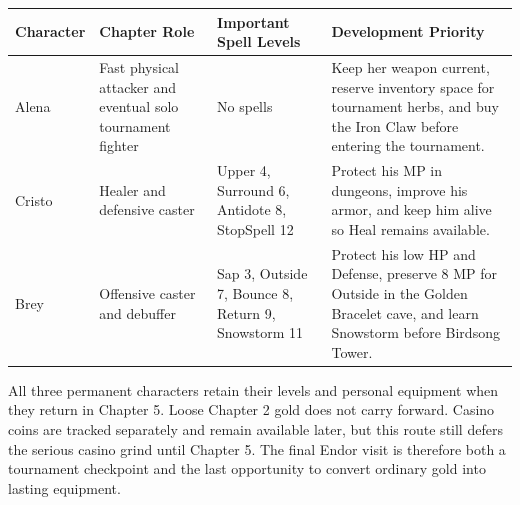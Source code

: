 \documentclass[
  american,
  10pt,
  letterpaper,
  oneside,
  open=any]{scrreprt}
\newcounter{none} %
\newenvironment{guidetable}{%
  \small\setstretch{1.0}%
  \setlength{\tabcolsep}{4pt}%
  \setlength{\LTpre}{8pt}\setlength{\LTpost}{10pt}%
  \renewcommand{\arraystretch}{1.16}%
}{ }
\begin{document}
\begin{guidetable}

{\def\LTcaptype{none} %
\begin{longtable}[]{@{}
  >{\raggedright\arraybackslash}p{}
  >{\raggedright\arraybackslash}p{}
  >{\raggedright\arraybackslash}p{}
  >{\raggedright\arraybackslash}p{}@{}}
\toprule\noalign{}
\begin{minipage}[b]{\linewidth}\raggedright
\color{GuideGreen}\bfseries Character
\end{minipage} & \begin{minipage}[b]{\linewidth}\raggedright
\color{GuideGreen}\bfseries Chapter Role
\end{minipage} & \begin{minipage}[b]{\linewidth}\raggedright
\color{GuideGreen}\bfseries Important Spell Levels
\end{minipage} & \begin{minipage}[b]{\linewidth}\raggedright
\color{GuideGreen}\bfseries Development Priority
\end{minipage} \\
\midrule\noalign{}
\endhead
\bottomrule\noalign{}
\endlastfoot
Alena & Fast physical attacker and eventual solo tournament fighter & No
spells & Keep her weapon current, reserve inventory space for tournament
herbs, and buy the Iron Claw before entering the tournament. \\
Cristo & Healer and defensive caster & Upper 4, Surround 6, Antidote 8,
StopSpell 12 & Protect his MP in dungeons, improve his armor, and keep
him alive so Heal remains available. \\
Brey & Offensive caster and debuffer & Sap 3, Outside 7, Bounce 8,
Return 9, Snowstorm 11 & Protect his low HP and Defense, preserve 8 MP
for Outside in the Golden Bracelet cave, and learn Snowstorm before
Birdsong Tower. \\
\end{longtable}
}

\end{guidetable}

All three permanent characters retain their levels and personal
equipment when they return in Chapter 5. Loose Chapter 2 gold does not
carry forward. Casino coins are tracked separately and remain available
later, but this route still defers the serious casino grind until
Chapter 5. The final Endor visit is therefore both a tournament
checkpoint and the last opportunity to convert ordinary gold into
lasting equipment.
\end{document}

